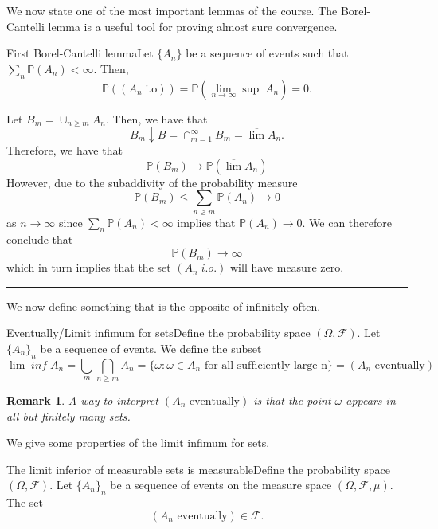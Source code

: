 \documentclass[twoside]{article}
\newtheorem{remark}[theorem]{Remark}
\newenvironment{proof}{{\bf Proof:}}{\hfill\rule{2mm}{2mm}}
\newcommand{\sigmalgebra}{\mathcal{F}}
\newcommand{\prob}{\mathbb{P}}
\begin{document}
We now state one of the most important lemmas of the course. The Borel-Cantelli lemma is a useful tool for proving almost sure convergence.

\begin{theorem_exam}{First Borel-Cantelli lemma}{}Let $\{A_n\}$ be a sequence of events such that $\sum_n\prob(A_n) < \infty.$ Then,
$$
\prob((A_n \; \text{i.o})) = \prob(\lim_{n \rightarrow \infty} \sup\;A_n) = 0.
$$
\end{theorem_exam}

\begin{proof} Let $B_m = \cup_{n \geq m}A_n$. Then, we have that $$B_m \downarrow B = \cap_{m=1}^{\infty}B_m = \overline{\lim}A_n.$$ Therefore, we have that 
$$
\prob(B_m) \rightarrow \prob(\overline{\lim}A_n)
$$
However, due to the subaddivity of the probability measure 
$$
\prob(B_m) \leq \sum_{n \geq m}\prob(A_n) \rightarrow 0
$$
as $n \rightarrow \infty$ since $\sum_n\prob(A_n) < \infty$ implies that $\prob(A_n) \rightarrow 0$. We can therefore conclude that 
$$
\prob(B_m) \rightarrow \infty
$$
which in turn implies that the set $(A_n \; i.o.)$ will have measure zero.
\end{proof}

We now define something that is the opposite of infinitely often.
 
\begin{definition_exam}{Eventually/Limit infimum for sets}{}Define the probability space $(\Omega, \sigmalgebra).$ Let $\{A_n\}_n$ be a sequence of events. We define the subset 
$$
\lim\;inf\;A_n = \bigcup_m\bigcap_{n \geq m}A_n = \{\omega: \omega \in A_n \text{ for all sufficiently large n}\} = (A_n \text{ eventually})
$$
\end{definition_exam}

\begin{remark} A way to interpret $(A_n \text{ eventually})$ is that the point $\omega$ appears in all but finitely many sets.
\end{remark}

We give some properties of the limit infimum for sets.

\begin{proposition_exam}{The limit inferior of measurable sets is measurable}{}Define the probability space $(\Omega, \sigmalgebra).$ Let $\{A_n\}_n$ be a sequence of events on the measure space $(\Omega, \sigmalgebra, \mu).$ The set $$(A_n \text{ eventually}) \in \sigmalgebra.$$
\end{proposition_exam}
\end{document}

